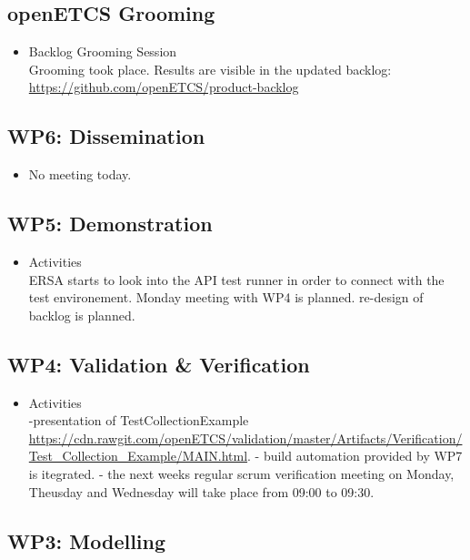 \documentclass[a4paper, 11pt]{article}
\begin{document}
\subsection{openETCS Grooming}
\begin{itemize}
\item Backlog Grooming Session\\
Grooming took place. Results are visible in the updated backlog:\\
\url{https://github.com/openETCS/product-backlog}

\end{itemize}

\subsection{WP6: Dissemination}
\begin{itemize}

\item No meeting today.
\end{itemize}

\subsection{WP5: Demonstration}

\begin{itemize}
\item Activities\\
ERSA starts to look into the API test runner in order to connect  with the test environement.
Monday meeting with WP4 is planned.
re-design of backlog is planned.  


\end{itemize}

\subsection{WP4: Validation \& Verification}
\begin{itemize}
\item Activities\\
-presentation of TestCollectionExample \url{https://cdn.rawgit.com/openETCS/validation/master/Artifacts/Verification/Test_Collection_Example/MAIN.html}.
- build automation provided by WP7 is itegrated.
- the next weeks regular scrum verification meeting on Monday, Theusday and Wednesday will take place from 09:00 to 09:30.
\end{itemize}

\subsection{WP3: Modelling}
\end{document}
